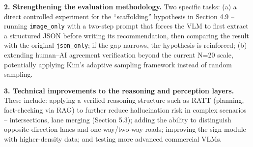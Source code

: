 \documentclass[12pt,a4paper]{report}
\begin{document}
\textbf{2. Strengthening the evaluation methodology.} Two specific tasks: (a) a direct controlled experiment for the ``scaffolding'' hypothesis in Section 4.9 -- running \texttt{image\_only} with a two-step prompt that forces the VLM to first extract a structured JSON before writing its recommendation, then comparing the result with the original \texttt{json\_only}; if the gap narrows, the hypothesis is reinforced; (b) extending human--AI agreement verification beyond the current N=20 scale, potentially applying Kim's \cite{kim2026augmenting} adaptive sampling framework instead of random sampling.

\textbf{3. Technical improvements to the reasoning and perception layers.} These include: applying a verified reasoning structure such as RATT \cite{zhang2025ratt} (planning, fact-checking via RAG) to further reduce hallucination risk in complex scenarios -- intersections, lane merging (Section 5.3); adding the ability to distinguish opposite-direction lanes and one-way/two-way roads; improving the sign module with higher-density data; and testing more advanced commercial VLMs.

\clearpage
{}


\end{document}
